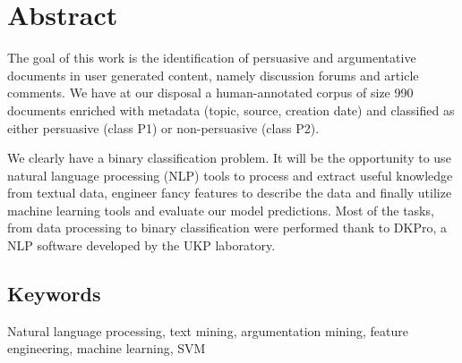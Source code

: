 \section*{Abstract}
The goal of this work is the identification of persuasive and argumentative documents in user generated content, namely discussion forums and article comments. We have at our disposal a human-annotated corpus of size 990 documents enriched with metadata (topic, source, creation date) and classified as either persuasive (class P1) or non-persuasive (class P2).

We clearly have a binary classification problem. It will be the opportunity to use natural language processing (NLP) tools to process and extract useful knowledge from textual data, engineer fancy features to describe the data and finally utilize machine learning tools and evaluate our model predictions. Most of the tasks, from data processing to binary classification were performed thank to DKPro, a NLP software developed by the UKP laboratory. 

\subsection*{Keywords}

Natural language processing, text mining, argumentation mining, feature engineering, machine learning, SVM